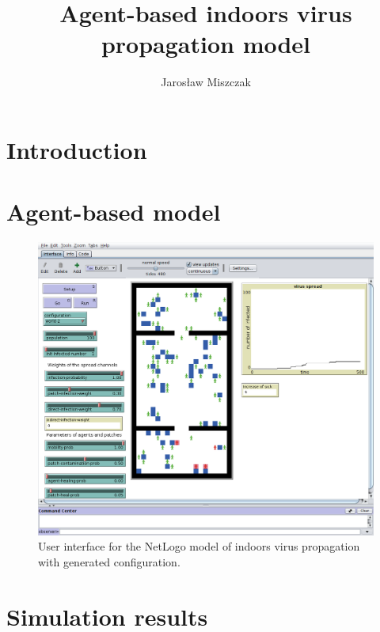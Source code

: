 \documentclass[11pt,a4paper]{article}
\title{Agent-based indoors virus propagation model}
\author{Jarosław Miszczak}
\begin{document}
\maketitle

\section{Introduction}


\section{Agent-based model}

\begin{figure}[ht!]
\includegraphics[width=\textwidth]{plots/model-gui.png}
\caption{User interface for the NetLogo model of indoors virus propagation with generated configuration.}
\end{figure}


\section{Simulation results}
\end{document}
